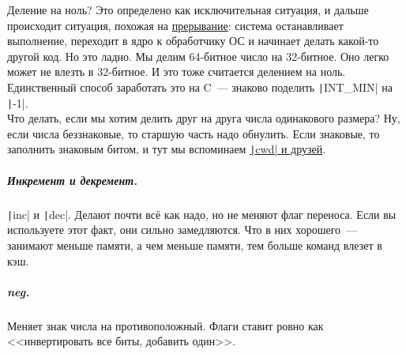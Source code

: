 \documentclass{article}
\begin{document}
    Деление на ноль? Это определено как исключительная ситуация, и дальше происходит ситуация, похожая на \hyperref[subpar:int]{прерывание}: система останавливает выполнение, переходит в ядро к обработчику ОС и начинает делать какой-то другой код. Но это ладно. Мы делим 64-битное число на 32-битное. Оно легко может не влезть в 32-битное. И это тоже считается делением на ноль. Единственный способ заработать это на C~--- знаково поделить \texttt|INT_MIN| на \texttt|-1|.\\
    Что делать, если мы хотим делить друг на друга числа одинакового размера? Ну, если числа беззнаковые, то старшую часть надо обнулить. Если знаковые, то заполнить знаковым битом, и тут мы вспоминаем \hyperref[subpar:cwd]{\texttt|cwd| и друзей}.
    \subparagraph{Инкремент и декремент.}
    \texttt|inc| и \texttt|dec|. Делают почти всё как надо, но не меняют флаг переноса. Если вы используете этот факт, они сильно замедляются. Что в них хорошего~--- занимают меньше памяти, а чем меньше памяти, тем больше команд влезет в кэш.
    \subparagraph{neg.}
    Меняет знак числа на противоположный. Флаги ставит ровно как <<инвертировать все биты, добавить один>>.
\end{document}
